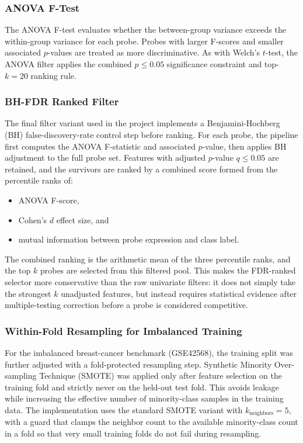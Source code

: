 \subsubsection{ANOVA F-Test}

The ANOVA F-test evaluates whether the between-group variance exceeds the within-group variance for each probe. Probes with larger F-scores and smaller associated $p$-values are treated as more discriminative. As with Welch's $t$-test, the ANOVA filter applies the combined $p \leq 0.05$ significance constraint and top-$k=20$ ranking rule.

\subsubsection{BH-FDR Ranked Filter}

The final filter variant used in the project implements a Benjamini-Hochberg (BH) false-discovery-rate control step before ranking. For each probe, the pipeline first computes the ANOVA F-statistic and associated $p$-value, then applies BH adjustment to the full probe set. Features with adjusted $p$-value $q \leq 0.05$ are retained, and the survivors are ranked by a combined score formed from the percentile ranks of:

\begin{itemize}
    \item ANOVA F-score,
    \item Cohen's $d$ effect size, and
    \item mutual information between probe expression and class label.
\end{itemize}

The combined ranking is the arithmetic mean of the three percentile ranks, and the top $k$ probes are selected from this filtered pool. This makes the FDR-ranked selector more conservative than the raw univariate filters: it does not simply take the strongest $k$ unadjusted features, but instead requires statistical evidence after multiple-testing correction before a probe is considered competitive.

\subsubsection{Within-Fold Resampling for Imbalanced Training}

For the imbalanced breast-cancer benchmark (GSE42568), the training split was further adjusted with a fold-protected resampling step. Synthetic Minority Over-sampling Technique (SMOTE) was applied only after feature selection on the training fold and strictly never on the held-out test fold. This avoids leakage while increasing the effective number of minority-class samples in the training data. The implementation uses the standard SMOTE variant with $k_{\text{neighbors}} = 5$, with a guard that clamps the neighbor count to the available minority-class count in a fold so that very small training folds do not fail during resampling.

